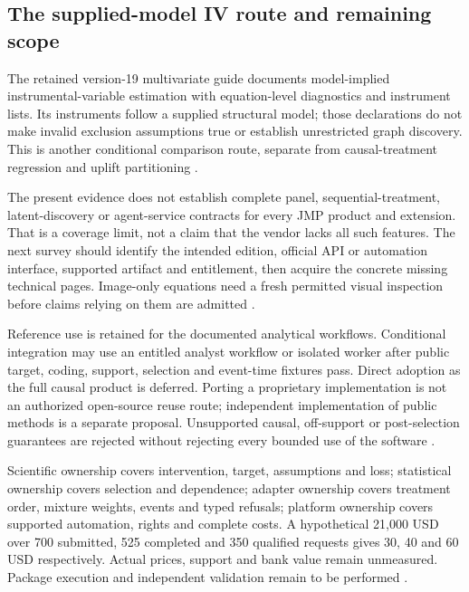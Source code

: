 \subsection{The supplied-model IV route and remaining scope}
The retained version-19 multivariate guide documents model-implied
instrumental-variable estimation with equation-level diagnostics and
instrument lists. Its instruments follow a supplied structural model;
those declarations do not make invalid exclusion assumptions true or
establish unrestricted graph discovery. This is another conditional
comparison route, separate from causal-treatment regression and uplift
partitioning \citep{exec13_ivrd_jmp}.

The present evidence does not establish complete panel, sequential-treatment,
latent-discovery or agent-service contracts for every JMP product and
extension. That is a coverage limit, not a claim that the vendor lacks all
such features. The next survey should identify the intended edition,
official API or automation interface, supported artifact and entitlement,
then acquire the concrete missing technical pages. Image-only equations
need a fresh permitted visual inspection before claims relying on them
are admitted \citep{exec24_jmp_choice}.

Reference use is retained for the documented analytical workflows.
Conditional integration may use an entitled analyst workflow or isolated
worker after public target, coding, support, selection and event-time
fixtures pass. Direct adoption as the full causal product is deferred.
Porting a proprietary implementation is not an authorized open-source
reuse route; independent implementation of public methods is a separate
proposal. Unsupported causal, off-support or post-selection guarantees
are rejected without rejecting every bounded use of the software
\citep{exec24_jmp_choice}.

Scientific ownership covers intervention, target, assumptions and loss;
statistical ownership covers selection and dependence; adapter ownership
covers treatment order, mixture weights, events and typed refusals; platform
ownership covers supported automation, rights and complete costs. A
hypothetical 21,000 USD over 700 submitted, 525 completed and 350
qualified requests gives 30, 40 and 60 USD respectively. Actual prices,
support and bank value remain unmeasured. Package execution and independent validation remain to be performed
\citep{exec24_jmp_choice}.
